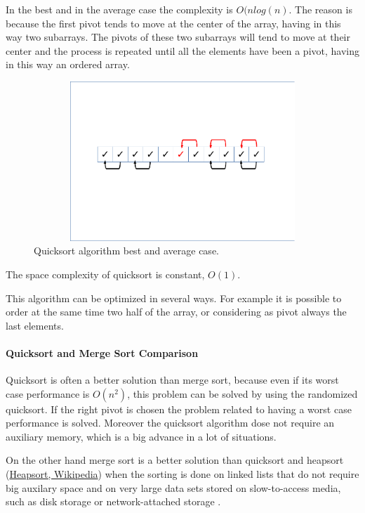 In the best and in the average case the complexity is \(O(n log(n)\). The reason is because the first pivot tends to move at the center of the array, having in this way two subarrays. The pivots of these two subarrays will tend to move at their center and the process is repeated until all the elements have been a pivot, having in this way an ordered array.

\begin{figure}[hb]
	\includegraphics[width=14cm,height=6cm]{chapters/searchandsorting/images/sorting_11.pdf}
	\caption[]{Quicksort algorithm best and average case.}
	\label{sorting_11}
\end{figure}

The space complexity of quicksort is constant, \(O(1)\).

This algorithm can be optimized in several ways. For example it is possible to order at the same time two half of the array, or considering as pivot always the last elements.

\paragraph{Quicksort and Merge Sort Comparison}
Quicksort is often a better solution than merge sort, because even if its worst case performance is \(O(n^{2})\), this problem can be solved by using the randomized quicksort. If the right pivot is chosen the problem related to having a worst case performance is solved. Moreover the quicksort algorithm dose not require an auxiliary memory, which is a big advance in a lot of situations.

On the other hand merge sort is a better solution than quicksort and heapsort \cite{wikiheapsort} (\href{https://en.wikipedia.org/wiki/Heapsort}{Heapsort, Wikipedia}) when the sorting is done on linked lists that do not require big auxilary space and on very large data sets stored on slow-to-access media, such as disk storage or network-attached storage \cite{wikiqicksort}.

